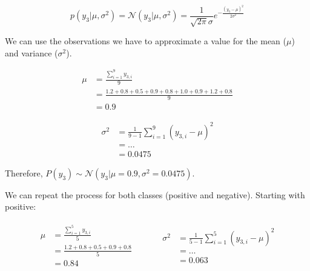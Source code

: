 \documentclass[12pt]{article}
\begin{document}
\begin{enumerate}[leftmargin=\labelsep,resume]
          $$
              p\left(y_3 | \mu, \sigma^2\right)
              = \mathcal{N}\left(y_3 | \mu, \sigma^2\right)
              = \frac{1}{\sqrt{2 \pi} \sigma} e ^{- \frac{\left(y_3- \mu\right)^2}{2 \sigma^2}}
          $$

          We can use the observations we have to approximate a value for the
          mean ($\mu$) and variance ($\sigma^2$).

          $$
              \begin{aligned}
                  \mu & = \frac{\sum^{9}_{i=1} y_{3,i}}{9}                              \\
                      & = \frac{1.2 + 0.8 + 0.5 + 0.9 + 0.8 + 1.0 + 0.9 + 1.2 + 0.8}{9} \\
                      & = 0.9
              \end{aligned}
          $$

          $$
              \begin{aligned}
                  \sigma^2 & = \frac{1}{9 - 1} \sum^9_{i=1} \left(y_{3,i} - \mu\right)^2 \\
                           & = \dots                                                     \\
                           & = 0.0475
              \end{aligned}
          $$

          Therefore, $P(y_3) \sim \mathcal{N}(y_3 | \mu = 0.9, \sigma^2 = 0.0475)$.

          We can repeat the process for both classes (positive and negative).
          Starting with positive:

          $$
              \begin{array}{c|c}
                  \begin{aligned}
                      \mu & = \frac{\sum^{5}_{i=1} y_{3,i}}{5}      \\
                          & = \frac{1.2 + 0.8 + 0.5 + 0.9 + 0.8}{5} \\
                          & = 0.84
                  \end{aligned}
                  \quad &
                  \quad
                  \begin{aligned}
                      \sigma^2 & = \frac{1}{5 - 1} \sum^5_{i=1} \left(y_{3,i} - \mu\right)^2 \\
                               & = \dots                                                     \\
                               & = 0.063
                  \end{aligned}
              \end{array}
          $$


\end{enumerate}
\end{document}

